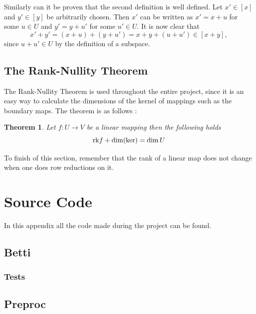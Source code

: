 \documentclass[11pt,a4paper,twoside]{report}
\newtheorem{mythm}{Theorem}[chapter]
\begin{document}
Similarly can it be proven that the second definition is well defined. Let $x'\in[x]$ and $y'\in [y]$ be arbitrarily chosen. Then $x'$ can be written as $x'=x+u$ for some $u\in U$ and $y' = y+u'$ for some $u'\in U$. It is now clear that
\begin{equation*}
x'+y'=(x+u)+(y+u')=x+y+(u+u')\in [x+y],
\end{equation*}
since $u+u'\in U$ by the definition of a subspace.


\section{The Rank-Nullity Theorem}
The Rank-Nullity Theorem is used throughout the entire project, since it is an easy way to calculate the dimensions of the kernel of mappings such as the boundary maps. The theorem is as follows \cite[p. 109]{LinAlg}: 
\begin{mythm}\label{thm:rank_nullity}
Let $f:U\to V$ be a linear mapping then the following holds
\begin{equation*}
\textnormal{rk}f+\dim(\ker)=\dim U
\end{equation*}
\end{mythm}

To finish of this section, remember that the rank of a linear map does not change when one does row reductions on it.

\chapter{Source Code}\label{ch:source_code}
In this appendix all the code made during the project can be found.
\section{Betti}


\newpage





\newpage

\subsection{Tests}




\newpage
\section{Preproc}

\newpage\null
\end{document}
